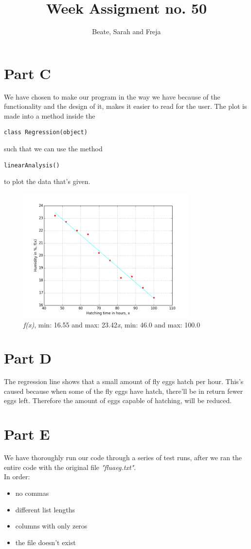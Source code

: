 \documentclass[a4paper]{article}
\title{Week Assigment no. 50}
\author{Beate, Sarah and Freja}
\begin{document}
\maketitle

\section*{Part C}
We have chosen to make our program in the way we have because of the functionality and the design of it, makes it easier to read for the user. The plot is made into a method inside the 
\begin{verbatim}class Regression(object) \end{verbatim} 
such that we can use the method \begin{verbatim}linearAnalysis() \end{verbatim} 
to plot the data that's given.

\begin{figure}[h]
\centering
\includegraphics[width=90mm]{flueaeg}
\caption{\textit{f(x)}, min: 16.55 and max: 23.42\quad\textit{x}, min: 46.0 and max: 100.0}
\label{fig:flueaeg}
\end{figure}

\section*{Part D}
The regression line shows that a small amount of fly eggs hatch per hour. This's caused because when some of the fly eggs have hatch, there'll be in return fewer eggs left. Therefore the amount of eggs capable of hatching, will be reduced.

\section*{Part E}
We have thoroughly run our code through a series of test runs, after we ran the entire code with the original file \textit{"fluaeg.txt"}.\\
In order:
\begin{itemize}
\item no commas
\item different list lengths
\item columns with only zeros
\item the file doesn't exist 
\end{itemize}
\end{document}
